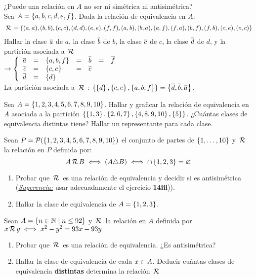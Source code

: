 ¿Puede una relación en $A$ no ser ni simétrica ni antisimétrica? \\

\ejercicio
Sea $A = \set{a, b, c, d, e, f}$. Dada la relación de equivalencia en $A$:
\begin{align*}
	\relacion = \set{(a, a), (b, b), (c, c), (d, d), (e, e), (f, f), (a, b), (b, a), (a, f), (f, a), (b, f), (f, b), (c, e), (e, c)}
\end{align*}
Hallar la clase $\clase{a}$ de $a$, la clase $\clase{b}$ de $b$, la clase $\clase{c}$ de $c$, la clase $\clase{d}$ de $d$, y la partición asociada a $\relacion$ \\
\veinticuatro
$\to
	\llave{rclclcl}{
		\clase{a} & = & \set{a, b, f}  & = & \clase{b} & = & \clase{f} \\
		\clase{c} & = & \set{c, e}     & = & \clase{e} &   & \\
		\clase{d} & = & \set{d}        &   &         &   & \\
	}$ \\
La partición asociada a $\relacion:\,  \set{\set{d}, \set{c,e}, \set{a, b, f}} = \set{\clase{d}, \clase{b}, \clase{a}}$.

\ejercicio
\Hacer
Sea $A = \set{1,2,3,4,5,6,7,8,9,10}$. Hallar y graficar la relación de equivalencia en $A$ asociada a la partición $\set{ \set{1,3}, \set{2,6,7}, \set{4,8,9,10}, \set{5} }$.
¿Cuántas clases de equivalencia distintas tiene? Hallar un representante para cada clase.

\ejercicio
\Hacer
Sean $P = \partes(\set{1,2,3,4,5,6,7,8,9,10})$ el conjunto de partes de $\set{1,\dots, 10}$ y $\relacion$ la relación en $P$ definida por:
\[
	A \relacion B \sisolosi (A \triangle B) \sisolosi \inter \set{1,2,3} = \vacio
\]
\begin{enumerate}[label=\roman*)]
	\item  Probar que $\relacion$ es una relación de equivalencia y decidir si es antisimétrica (\textit{\underline{Sugerencia:}} usar adecuadamente el ejercicio \textbf{14iii})).
	\item Hallar la clase de equivalencia de $A = \set{1,2,3}$.
\end{enumerate}

\separadorCorto

\ejercicio
Sean $A = \set{n \en \naturales \talque n \leq 92}$ y
$\relacion$ la relación en $A$ definida por
$x \relacion y \sisolosi x^2 - y^2 = 93x - 93y$
\begin{enumerate}[label=\roman*)]
	\item Probar que $\relacion$ es una relación de equivalencia. ¿Es antisimétrica?
	\item Hallar la clase de equivalencia de cada $x \en A$. Deducir cuántas clases de equivalencia \textbf{distintas} determina la relación $\relacion$
\end{enumerate}

